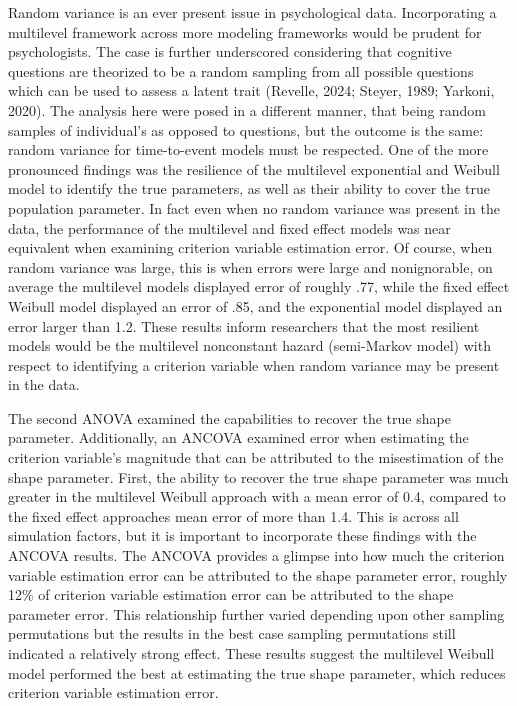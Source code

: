 \documentclass[12pt]{./styles/outhesis}
\begin{document}
Random variance is an ever present issue in psychological data.
Incorporating a multilevel framework across more modeling frameworks
would be prudent for psychologists. The case is further underscored
considering that cognitive questions are theorized to be a random
sampling from all possible questions which can be used to assess a
latent trait (Revelle, 2024; Steyer, 1989; Yarkoni, 2020). The analysis
here were posed in a different manner, that being random samples of
individual's as opposed to questions, but the outcome is the same:
random variance for time-to-event models must be respected. One of the
more pronounced findings was the resilience of the multilevel
exponential and Weibull model to identify the true parameters, as well
as their ability to cover the true population parameter. In fact even
when no random variance was present in the data, the performance of the
multilevel and fixed effect models was near equivalent when examining
criterion variable estimation error. Of course, when random variance was
large, this is when errors were large and nonignorable, on average
the multilevel models displayed error of roughly .77, while the fixed
effect Weibull model displayed an error of .85, and the exponential
model displayed an error larger than 1.2. These results inform
researchers that the most resilient models would be the multilevel
nonconstant hazard (semi-Markov model) with respect to identifying a
criterion variable when random variance may be present in the data.

The second ANOVA examined the capabilities to recover the true shape
parameter. Additionally, an ANCOVA examined error when estimating the criterion
variable's magnitude that can be attributed to the misestimation of the
shape parameter. First, the ability to recover the true shape parameter
was much greater in the multilevel Weibull approach with a mean error of
0.4, compared to the fixed effect approaches mean error of more than
1.4. This is across all simulation factors, but it is important to
incorporate these findings with the ANCOVA results. The ANCOVA provides
a glimpse into how much the criterion variable estimation error can be
attributed to the shape parameter error, roughly 12\% of criterion
variable estimation error can be attributed to the shape parameter
error. This relationship further varied depending upon other sampling
permutations but the results in the best case sampling permutations
still indicated a relatively strong effect. These results suggest the
multilevel Weibull model performed the best at estimating the true shape
parameter, which reduces criterion variable estimation error.
\end{document}
